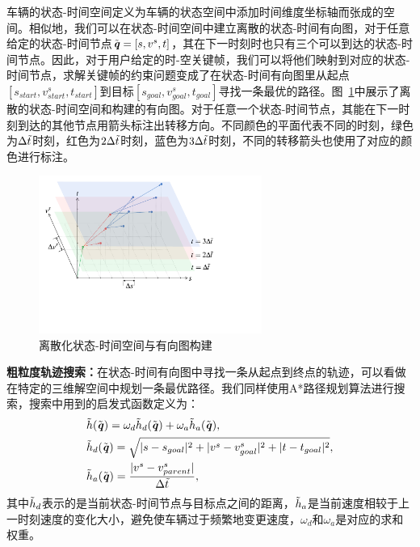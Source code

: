 车辆的状态-时间空间定义为车辆的状态空间中添加时间维度坐标轴而张成的空间。相似地，我们可以在状态-时间空间中建立离散的状态-时间有向图，对于任意给定的状态-时间节点$\Tilde{\textbf{\emph{q}}}=[s, v^s, t]$，其在下一时刻时也只有三个可以到达的状态-时间节点。因此，对于用户给定的时-空关键帧，我们可以将他们映射到对应的状态-时间节点，求解关键帧的约束问题变成了在状态-时间有向图里从起点$[s_{start}, v^s_{start}, t_{start}]$到目标$[s_{goal}, v^s_{goal}, t_{goal}]$寻找一条最优的路径。图~\ref{fig:keyframe_sttspace}中展示了离散的状态-时间空间和构建的有向图。对于任意一个状态-时间节点，其能在下一时刻到达的其他节点用箭头标注出转移方向。不同颜色的平面代表不同的时刻，绿色为$\Delta\Tilde{t}$时刻，红色为$2\Delta\Tilde{t}$时刻，蓝色为$3\Delta\Tilde{t}$时刻，不同的转移箭头也使用了对应的颜色进行标注。

\begin{figure}[!tbh]
\centering
\includegraphics[width=0.65\textwidth]{figure/keyframe/state_time_space.pdf}
\caption[离散化状态-时间空间与有向图构建]{
离散化状态-时间空间与有向图构建
}
\label{fig:keyframe_sttspace}
\end{figure}

\textbf{粗粒度轨迹搜索：}在状态-时间有向图中寻找一条从起点到终点的轨迹，可以看做在特定的三维解空间中规划一条最优路径。我们同样使用A*路径规划算法进行搜索，搜索中用到的启发式函数定义为：
\begin{equation}
\setlength\abovedisplayskip{10pt}
\setlength\belowdisplayskip{10pt}
\label{eq:keyframe_sttheuristic}
\begin{aligned}
    & \Tilde{h}(\Tilde{\textbf{\emph{q}}}) = \omega_d \Tilde{h}_d(\Tilde{\textbf{\emph{q}}}) + \omega_a \Tilde{h}_a(\Tilde{\textbf{\emph{q}}}), \\
    & \Tilde{h}_d(\Tilde{\textbf{\emph{q}}}) = \sqrt{ | s - s_{goal} |^2 + | v^s - v^s_{goal} |^2 + | t - t_{goal} |^2 },\\
    & \Tilde{h}_a(\Tilde{\textbf{\emph{q}}}) = \frac{|v^s - v^s_{parent}|}{\Delta{\Tilde{t}}} ,\\
\end{aligned}
\end{equation}
其中$\Tilde{h}_d$表示的是当前状态-时间节点与目标点之间的距离，$\Tilde{h}_a$是当前速度相较于上一时刻速度的变化大小，避免使车辆过于频繁地变更速度，$\omega_d$和$\omega_a$是对应的求和权重。

